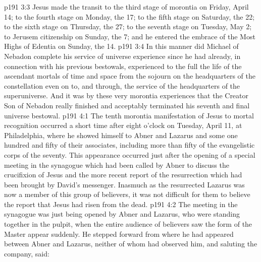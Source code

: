 \vs p191 3:3 Jesus made the transit to the third stage of morontia on Friday, April 14; to the fourth stage on Monday, the 17; to the fifth stage on Saturday, the 22; to the sixth stage on Thursday, the 27; to the seventh stage on Tuesday, May 2; to Jerusem citizenship on Sunday, the 7; and he entered the embrace of the Most Highs of Edentia on Sunday, the 14.
\vs p191 3:4 In this manner did Michael of Nebadon complete his service of universe experience since he had already, in connection with his previous bestowals, experienced to the full the life of the ascendant mortals of time and space from the sojourn on the headquarters of the constellation even on to, and through, the service of the headquarters of the superuniverse. And it was by these very morontia experiences that the Creator Son of Nebadon really finished and acceptably terminated his seventh and final universe bestowal.
\vs p191 4:1 The tenth morontia manifestation of Jesus to mortal recognition occurred a short time after eight o’clock on Tuesday, April 11, at Philadelphia, where he showed himself to Abner and Lazarus and some one hundred and fifty of their associates, including more than fifty of the evangelistic corps of the seventy. This appearance occurred just after the opening of a special meeting in the synagogue which had been called by Abner to discuss the crucifixion of Jesus and the more recent report of the resurrection which had been brought by David’s messenger. Inasmuch as the resurrected Lazarus was now a member of this group of believers, it was not difficult for them to believe the report that Jesus had risen from the dead.
\vs p191 4:2 The meeting in the synagogue was just being opened by Abner and Lazarus, who were standing together in the pulpit, when the entire audience of believers saw the form of the Master appear suddenly. He stepped forward from where he had appeared between Abner and Lazarus, neither of whom had observed him, and saluting the company, said:
